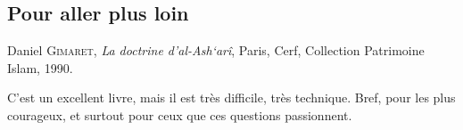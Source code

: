 
\subsection{Pour aller plus loin}

Daniel \textsc{Gimaret}, \emph{La doctrine d'al-Ash`arî}, Paris, Cerf,
Collection Patrimoine Islam, 1990.

C'est un excellent livre, mais il est très difficile, très technique.
Bref, pour les plus courageux, et surtout pour ceux que ces questions
passionnent.
 
 